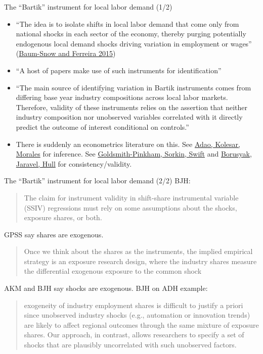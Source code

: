 \documentclass[10pt,notes=hide]{beamer}
\begin{document}
\begin{frame}{The ``Bartik'' instrument for local labor demand (1/2)}
\begin{itemize}
	\item {\small ``The idea is to isolate shifts in local labor demand that come only from national shocks in each sector of the economy, thereby purging potentially endogenous local demand shocks driving variation in employment or wages'' (\href{https://ideas.repec.org/h/eee/regchp/5-3.html}{Baum-Snow and Ferreira 2015})\par}
	\item ``A host of papers make use of such instruments for identification''
	\item {\small ``The main source of identifying variation in Bartik instruments comes from differing base year industry compositions across local labor markets. Therefore, validity of these instruments relies on the assertion that neither industry composition nor unobserved variables correlated with it directly predict the outcome of interest conditional on controls.''\par}
	\item There is suddenly an econometrics literature on this. 
	See \href{https://academic.oup.com/qje/article-abstract/134/4/1949/5552146}{Adao, Kolesar, Morales} for inference.
	See \href{https://www.aeaweb.org/articles?id=10.1257/aer.20181047}{Goldsmith-Pinkham, Sorkin, Swift} and \href{http://about.peterhull.net/wp}{Borusyak, Jaravel, Hull} for consistency/validity.
\end{itemize}
\end{frame}
\begin{frame}{The ``Bartik'' instrument for local labor demand (2/2)}
BJH:
\begin{quote}
The claim for instrument validity in shift-share instrumental variable (SSIV) regressions must rely on some assumptions about the shocks, exposure shares, or both.\par
\end{quote}
GPSS say shares are exogenous.
\begin{quote}
Once we think about the shares as the instruments, the implied empirical strategy is an exposure research design, where the industry shares measure the differential exogenous exposure to the common shock
\end{quote}
AKM and BJH say shocks are exogenous.
BJH on ADH example:
\begin{quote}
exogeneity of industry employment shares is difficult to justify a priori since unobserved industry shocks (e.g., automation or innovation trends) are likely to affect regional outcomes through the same mixture of exposure shares. Our approach, in contrast, allows researchers to specify a set of shocks that are plausibly uncorrelated with such unobserved factors.\par
\end{quote}
\end{frame}
\end{document}
